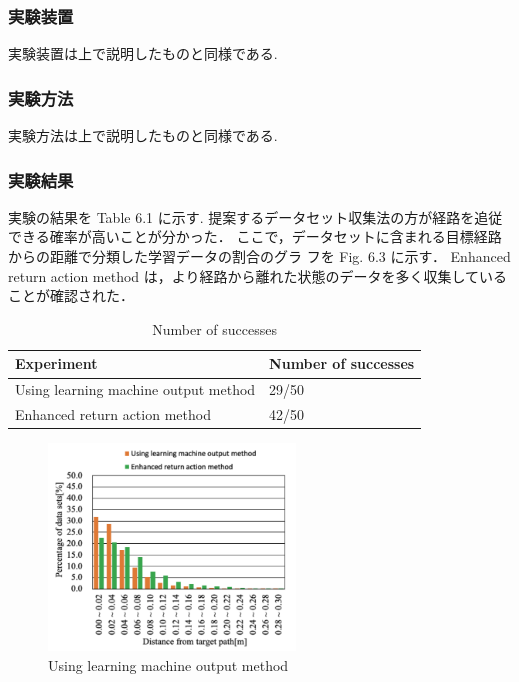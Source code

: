 \documentclass{jarticle}
\begin{document}
\subsubsection{実験装置}
実験装置は上で説明したものと同様である.

\subsubsection{実験方法}
実験方法は上で説明したものと同様である.

\subsubsection{実験結果}
実験の結果を Table 6.1 に示す. 提案するデータセット収集法の方が経路を追従できる確率が高いことが分かった．
ここで，データセットに含まれる目標経路からの距離で分類した学習データの割合のグラ
フを Fig. 6.3 に示す． Enhanced return action method は，より経路から離れた状態のデータを多く収集していることが確認された．


\begin{table}[h!]
  \caption{Number of successes} \vspace*{2mm}\hspace*{-10mm}
    \begin{tabular}{|l|l|}
      \hline\hline
      Experiment & Number of successes \\
      \hline\hline
      Using learning machine output method & 29/50 \\
      Enhanced return action method & 42/50\\
      \hline
    \end{tabular}
\end {table}


\begin{figure}[h!]\vspace*{-5mm}
  \centering
   \includegraphics[height=55mm]{./figs/enh.png}
   \caption{Using learning machine output method}
\end{figure}
\end{document}
